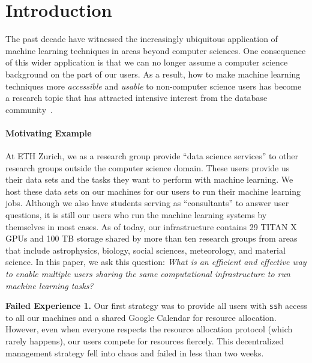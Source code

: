 \documentclass[letterpaper]{vldb}
\begin{document}
\vspace{-1em}
\section{Introduction}\label{sec:introduction}

The past decade have witnessed the increasingly 
ubiquitous application of machine learning techniques 
in areas beyond computer sciences. 
One consequence of this wider application
is that we can no longer assume a computer science 
background on the part of our users. As a result, how to make
machine learning techniques more {\em accessible} and
{\em usable} to non-computer science users has become
a research topic that has attracted intensive interest
from the database community~\cite{Tamagnini2017,Varma2017,Krishnan2017,Binnig2016,Bailis2017}.

\paragraph*{Motivating Example} At ETH Zurich,
we as a research group provide ``data science
services'' to other research groups outside the computer science domain.
These users provide
us their data sets and the tasks they 
want to perform with machine learning. We host these data sets on our machines
for our users to run their machine learning
jobs.
Although we also have students serving as ``consultants''
to answer user questions, it is still our
users who run the machine learning systems
by themselves in most cases. As of today, our infrastructure
contains 29 TITAN X GPUs and 100 TB storage
shared by more than ten research groups
from areas that include astrophysics,
biology, social sciences, meteorology, 
and material science.
In this paper, we ask this question: {\em What is an
efficient and effective way to enable multiple users sharing 
the same computational infrastructure to run
machine learning tasks?}

\vspace{0.1em}
\noindent
{\bf Failed Experience 1.} Our first strategy was to provide
all users with \texttt{ssh} access to all our machines
and a shared Google Calendar for resource allocation.
However, even when everyone respects the resource allocation
protocol (which rarely happens), our users compete for 
resources fiercely. This decentralized management strategy fell into chaos and failed in less than two weeks. 
\end{document}
